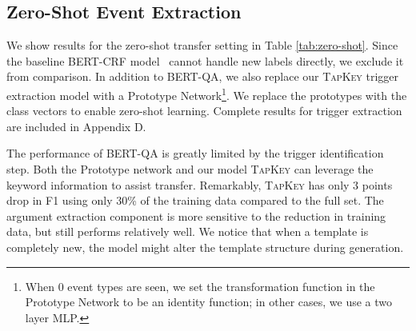 \subsection{Zero-Shot Event Extraction}
We show results for the zero-shot transfer setting in Table \ref{tab:zero-shot}.
Since the baseline BERT-CRF model~\cite{shi2019simpleBERTCRF} cannot handle new labels directly, we exclude it from comparison.
In addition to BERT-QA, we also replace our \textsc{TapKey} trigger extraction model with a Prototype Network\cite{Snell2017PrototypicalNF}\footnote{When 0 event types are seen, we set the transformation function in the Prototype Network to be an identity function; in other cases, we use a two layer MLP.}. %
We replace the prototypes with the class vectors to enable zero-shot learning.  Complete results for trigger extraction are included in Appendix D.

The performance of BERT-QA is greatly limited by the trigger identification step. Both the Prototype network and our model \textsc{TapKey} can leverage the keyword information to assist transfer. 
Remarkably, \textsc{TapKey} has only 3 points drop in F1 using only 30\% of the training data compared to the full set. 
The argument extraction component is more sensitive to the reduction in training data, but still performs relatively well. 
We notice that when a template is completely new, the model might alter the template structure during generation. 

